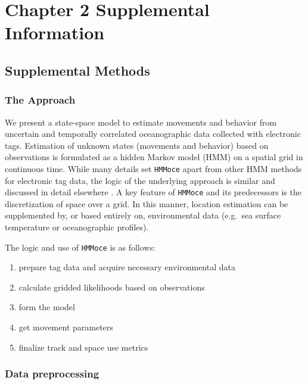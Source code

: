 
\chapter{Chapter 2 Supplemental Information}
\label{sec:app2}
\raggedbottom




\clearpage

\section{Supplemental Methods}

\subsection{The Approach}

We present a state-space model to estimate movements and behavior from
uncertain and temporally correlated oceanographic data collected with
electronic tags. Estimation of unknown states (movements and behavior)
based on observations is formulated as a hidden Markov model (HMM) on a
spatial grid in continuous time. While many details set \texttt{HMMoce}
apart from other HMM methods for electronic tag data, the logic of the
underlying approach is similar and discussed in detail elsewhere
\citep{Pedersen2008, Pedersen2011, Thygesen2009a}. A key feature of
\texttt{HMMoce} and its predecessors is the discretization of space over
a grid. In this manner, location estimation can be supplemented by, or
based entirely on, environmental data (e.g.~sea surface temperature or
oceanographic profiles).

The logic and use of \texttt{HMMoce} is as follows: 
\begin{enumerate}[itemsep=-1mm]
    \item prepare tag data and acquire necessary environmental data
    \item calculate gridded likelihoods based on observations
    \item form the model
    \item get movement parameters
    \item finalize track and space use metrics
\end{enumerate}

\subsection{Data preprocessing}%

